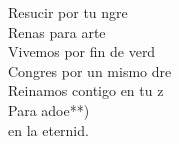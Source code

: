 \begin{cancion}
\begin{chorus}
		Resucir por tu ngre\\
		Renas para arte\\
		Vivemos por fin de verd\\
		Congres por un mismo dre\\
		Reinamos contigo en tu z\\
		Para adoe**)\\
		en la eternid.\jump\\
	\end{chorus}%
\end{cancion}%
